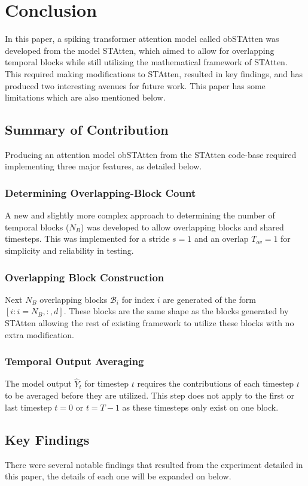 \documentclass[../main.tex]{subfiles}
\begin{document}
\section{Conclusion}
\label{sec:conc}
In this paper, a spiking transformer attention model called obSTAtten was developed from the model STAtten\cite{STAtten}, which aimed to allow for overlapping temporal blocks while still utilizing the mathematical framework of STAtten. This required making modifications to STAtten, resulted in key findings, and has produced two interesting avenues for future work. This paper has some limitations which are also mentioned below.

\subsection{Summary of Contribution}
Producing an attention model obSTAtten from the STAtten code-base required implementing three major features, as detailed below.

\subsubsection{Determining Overlapping-Block Count}
A new and slightly more complex approach to determining the number of temporal blocks ($N_B$) was developed to allow overlapping blocks and shared timesteps. This was implemented for a stride $s=1$ and an overlap $T_{ov}=1$ for simplicity and reliability in testing.

\subsubsection{Overlapping Block Construction}
Next $N_B$ overlapping blocks $\mathcal{B}_i$ for index $i$ are generated of the form $[i:i=N_B,:,d]$. These blocks are the same shape as the blocks generated by STAtten allowing the rest of existing framework to utilize these blocks with no extra modification.

\subsubsection{Temporal Output Averaging}
The model output $\hat{Y}_t$ for timestep $t$ requires the contributions of each timestep $t$ to be averaged before they are utilized. This step does not apply to the first or last timestep $t=0$ or $t=T-1$ as these timesteps only exist on one block.

\subsection{Key Findings}
There were several notable findings that resulted from the experiment detailed in this paper, the details of each one will be expanded on below.
\end{document}
